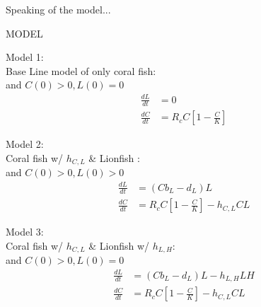 \documentclass[11pt]{article}
\begin{document}
{\parindent0pt
Speaking of the model...

\begin{center}
MODEL
\end{center}

Model 1:\\
Base Line model of only coral fish:  \\
and $C(0) > 0,  L(0) = 0$\\
\begin{align*}
\frac{dL}{dt} &= 0  \\
\frac{dC}{dt} &= R_{c}C \left[ 1 - \frac{C}{K} \right]
\end{align*}

Model 2:\\
Coral fish w/ $h_{C,L}$ \& Lionfish :\\
and $C(0) > 0,  L(0) > 0$\\
\begin{align*}
\frac{dL}{dt} &= (C b_{L} - d_{L}) L\\
\frac{dC}{dt} &= R_{c}C \left[ 1 - \frac{C}{K} \right] - h_{C,L}CL
\end{align*}

Model 3:\\
Coral fish w/ $h_{C,L}$ \& Lionfish w/ $h_{L,H}$:\\
and $C(0) > 0,  L(0) = 0$\\
\begin{align*}
\frac{dL}{dt} &= (C b_{L} - d_{L}) L - h_{L,H}LH\\
\frac{dC}{dt} &= R_{c}C \left[ 1 - \frac{C}{K} \right] - h_{C,L}CL
\end{align*}

}
\end{document}
